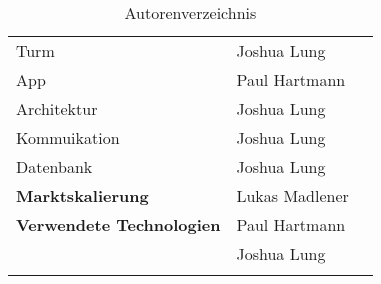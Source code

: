 \begin{longtable}{llr}
  Turm                              & Joshua Lung    &                 \\
  App                               & Paul Hartmann  &                 \\
  Architektur                       & Joshua Lung    &                 \\
  Kommuikation                      & Joshua Lung    &                 \\
  Datenbank                         & Joshua Lung    &                 \\
  \midrule
  \textbf{Marktskalierung}          & Lukas Madlener &                 \\
  \midrule
  \textbf{Verwendete Technologien}  & Paul Hartmann  &                 \\
                                    & Joshua Lung    &                 \\
  \bottomrule

  \caption{Autorenverzeichnis}
  \label{tab:autorenverzeichnis}
\end{longtable}





